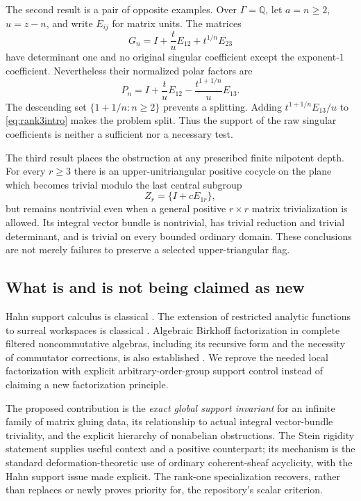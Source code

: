 \documentclass[11pt,letterpaper]{article}
\theoremstyle{definition}
\theoremstyle{remark}
\newcommand{\Q}{\mathbb Q}
\numberwithin{equation}{section}
\begin{document}
The second result is a pair of opposite examples. Over $\Gamma=\Q$, let $a=n\geq2$, $u=z-n$, and write $E_{ij}$ for matrix units. The matrices
\begin{equation}\label{eq:rank3intro}
 G_n=I+\frac{t}{u}E_{12}+t^{1/n}E_{23}
\end{equation}
have determinant one and no original singular coefficient except the exponent-$1$ coefficient. Nevertheless their normalized polar factors are
\begin{equation}\label{eq:rank3polarintro}
 P_n=I+\frac{t}{u}E_{12}-\frac{t^{1+1/n}}{u}E_{13}.
\end{equation}
The descending set $\{1+1/n:n\geq2\}$ prevents a splitting. Adding $t^{1+1/n}E_{13}/u$ to \eqref{eq:rank3intro} makes the problem split. Thus the support of the raw singular coefficients is neither a sufficient nor a necessary test.

The third result places the obstruction at any prescribed finite nilpotent depth. For every $r\geq3$ there is an upper-unitriangular positive cocycle on the plane which becomes trivial modulo the last central subgroup
\[
 Z_r=\{I+cE_{1r}\},
\]
but remains nontrivial even when a general positive $r\times r$ matrix trivialization is allowed. Its integral vector bundle is nontrivial, has trivial reduction and trivial determinant, and is trivial on every bounded ordinary domain. These conclusions are not merely failures to preserve a selected upper-triangular flag.

\subsection{What is and is not being claimed as new}

Hahn support calculus is classical \cite{Neumann}. The extension of restricted analytic functions to surreal workspaces is classical \cite{vdDE}. Algebraic Birkhoff factorization in complete filtered noncommutative algebras, including its recursive form and the necessity of commutator corrections, is also established \cite{EFGK,EFMP}. We reprove the needed local factorization with explicit arbitrary-order-group support control instead of claiming a new factorization principle.

The proposed contribution is the \emph{exact global support invariant} for an infinite family of matrix gluing data, its relationship to actual integral vector-bundle triviality, and the explicit hierarchy of nonabelian obstructions. The Stein rigidity statement supplies useful context and a positive counterpart; its mechanism is the standard deformation-theoretic use of ordinary coherent-sheaf acyclicity, with the Hahn support issue made explicit. The rank-one specialization recovers, rather than replaces or newly proves priority for, the repository's scalar criterion.
\end{document}
